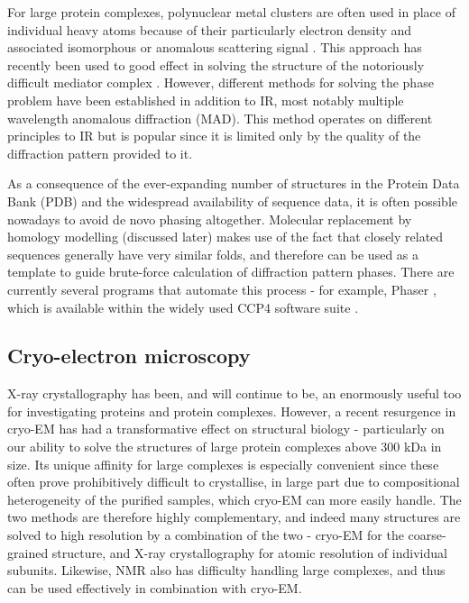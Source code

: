 \documentclass[a4paper,11pt,twoside,openright]{scrbook}
\begin{document}
For large protein complexes, polynuclear metal clusters are often used in place of individual heavy atoms because of their particularly electron density and associated isomorphous or anomalous scattering signal \cite{Dauter2005}. This approach has recently been used to good effect in solving the structure of the notoriously difficult mediator complex \cite{Nozawa2017}. However, different methods for solving the phase problem have been established in addition to IR, most notably multiple wavelength anomalous diffraction \cite{Hendrickson1991} (MAD). This method operates on different principles to IR but is popular since it is limited only by the quality of the diffraction pattern provided to it.

As a consequence of the ever-expanding number of structures in the Protein Data Bank \cite{Berman2000} (PDB) and the widespread availability of sequence data, it is often possible nowadays to avoid de novo phasing altogether. Molecular replacement by homology modelling (discussed later) makes use of the fact that closely related sequences generally have very similar folds, and therefore can be used as a template to guide brute-force calculation of diffraction pattern phases. There are currently several programs that automate this process - for example, Phaser \cite{McCoy2007}, which is available within the widely used CCP4 software suite \cite{Winn2011}.

\subsection{Cryo-electron microscopy}
X-ray crystallography has been, and will continue to be, an enormously useful too for investigating proteins and protein complexes. However, a recent resurgence in cryo-EM has had a transformative effect on structural biology - particularly on our ability to solve the structures of large protein complexes above 300 kDa in size. Its unique affinity for large complexes is especially convenient since these often prove prohibitively difficult to crystallise, in large part due to compositional heterogeneity of the purified samples, which cryo-EM can more easily handle. The two methods are therefore highly complementary, and indeed many structures are solved to high resolution by a combination of the two - cryo-EM for the coarse-grained structure, and X-ray crystallography for atomic resolution of individual subunits. Likewise, NMR also has difficulty handling large complexes, and thus can be used effectively in combination with cryo-EM.
\end{document}
